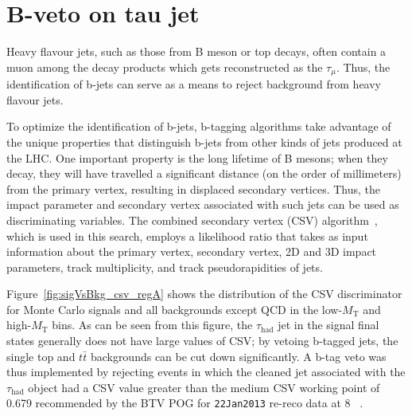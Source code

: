 \section{B-veto on tau jet\label{sec:evtsel-bveto}}

Heavy flavour jets, such as those from B meson or top decays, often contain a muon among the decay products which gets reconstructed as the $\tau_{\mu}$. Thus, the identification of b-jets can serve as a means to reject background from heavy flavour jets.

To optimize the identification of b-jets, b-tagging algorithms take advantage of the unique properties that distinguish b-jets from other kinds of jets produced at the LHC. One important property is the long lifetime of B mesons; when they decay, they will have travelled a significant distance (on the order of millimeters) from the primary vertex, resulting in displaced secondary vertices.  Thus, the impact parameter and secondary vertex associated with such jets can be used as discriminating variables. The combined secondary vertex (CSV) algorithm~\cite{Weiser:927399}, which is used in this search, employs a likelihood ratio that takes as input information about the primary vertex, secondary vertex, 2D and 3D impact parameters, track multiplicity, and track pseudorapidities of jets.

Figure~\ref{fig:sigVsBkg_csv_regA} shows the distribution of the CSV discriminator for Monte Carlo signals and all backgrounds except QCD in the low-$M_{\text{T}}$ and high-$M_{\text{T}}$ bins. As can be seen from this figure, the $\tau_{\text{had}}$ jet in the signal final states generally does not have large values of CSV; by vetoing b-tagged jets, the single top and $t\bar{t}$ backgrounds can be cut down significantly. A b-tag veto was thus implemented by rejecting events in which the cleaned jet associated with the $\tau_{\text{had}}$ object had a CSV value greater than the medium CSV working point of 0.679 recommended by the BTV POG for \texttt{22Jan2013} re-reco data at 8 \TeV~\cite{CMS:btvpogtwiki}.


